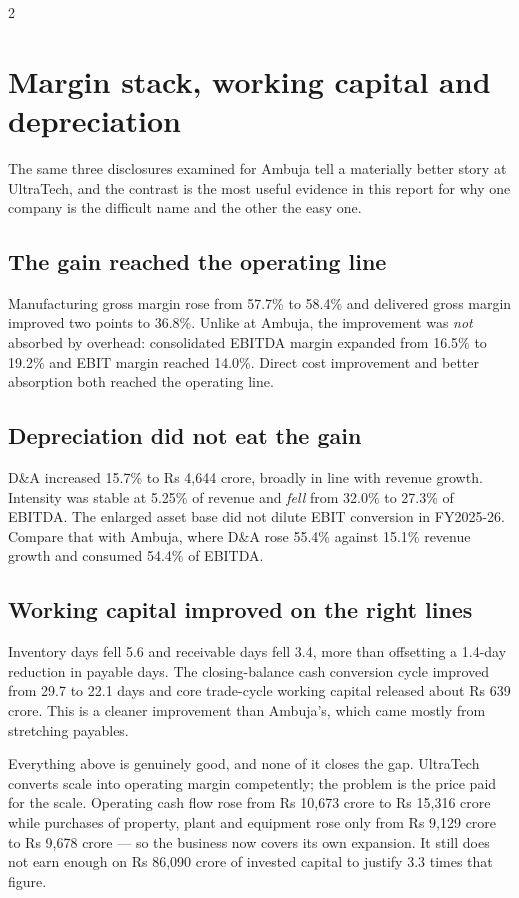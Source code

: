 \begin{paracol}{2}
\section{Margin stack, working capital and depreciation}

The same three disclosures examined for Ambuja tell a materially better story at
UltraTech, and the contrast is the most useful evidence in this report for why one
company is the difficult name and the other the easy one.

\subsection{The gain reached the operating line}

Manufacturing gross margin rose from 57.7\% to 58.4\% and delivered gross margin
improved two points to 36.8\%. Unlike at Ambuja, the improvement was \emph{not}
absorbed by overhead: consolidated EBITDA margin expanded from 16.5\% to 19.2\% and
EBIT margin reached 14.0\%. Direct cost improvement and better absorption both
reached the operating line.

\subsection{Depreciation did not eat the gain}

D\&A increased 15.7\% to Rs 4,644 crore, broadly in line with revenue growth.
Intensity was stable at 5.25\% of revenue and \emph{fell} from 32.0\% to 27.3\% of
EBITDA. The enlarged asset base did not dilute EBIT conversion in FY2025-26. Compare
that with Ambuja, where D\&A rose 55.4\% against 15.1\% revenue growth and consumed
54.4\% of EBITDA.

\subsection{Working capital improved on the right lines}

Inventory days fell 5.6 and receivable days fell 3.4, more than offsetting a 1.4-day
reduction in payable days. The closing-balance cash conversion cycle improved from
29.7 to 22.1 days and core trade-cycle working capital released about Rs 639 crore.
This is a cleaner improvement than Ambuja's, which came mostly from stretching
payables.

\begin{keybox}
Everything above is genuinely good, and none of it closes the gap. UltraTech converts
scale into operating margin competently; the problem is the price paid for the scale.
Operating cash flow rose from Rs 10,673 crore to Rs 15,316 crore while purchases of
property, plant and equipment rose only from Rs 9,129 crore to Rs 9,678 crore — so the
business now covers its own expansion. It still does not earn enough on Rs 86,090
crore of invested capital to justify 3.3 times that figure.
\end{keybox}


\end{paracol}
